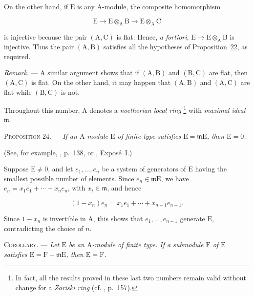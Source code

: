 On the other hand, if $\mathrm{E}$ is any $\mathrm{A}$-module, the composite homomorphism

\begin{equation*}
\mathrm{E}\longrightarrow \mathrm{E}\otimes_\mathrm{A}\mathrm{B}\longrightarrow \mathrm{E}\otimes_\mathrm{A}\mathrm{C}
\end{equation*}

is injective because the pair $(\mathrm{A},\mathrm{C})$ is flat. Hence, \emph{a fortiori},
$\mathrm{E}\to \mathrm{E}\otimes_\mathrm{A}\mathrm{B}$ is injective. Thus the pair $(\mathrm{A},\mathrm{B})$ satisfies all the
hypotheses of Proposition~\hyperref[gaga:prop:22]{22}, as required.

\emph{Remark}. --- A similar argument shows
that if $(\mathrm{A},\mathrm{B})$ and $(\mathrm{B},\mathrm{C})$ are flat, then $(\mathrm{A},\mathrm{C})$ is flat. On the other hand,
it may happen that $(\mathrm{A},\mathrm{B})$ and $(\mathrm{A},\mathrm{C})$ are flat while $(\mathrm{B},\mathrm{C})$ is not.


Throughout this number, $\mathrm{A}$ denotes a \emph{noetherian local ring}
\footnote{In fact, all the results proved in these last two numbers remain
valid without change for a \emph{Zariski ring} (cf. , p.~157).} with
\emph{maximal ideal} $\mathfrak{m}$.

\textsc{Proposition 24}. --- \emph{If an $\mathrm{A}$-module
$\mathrm{E}$ of finite type satisfies $\mathrm{E}=\mathfrak{m}\mathrm{E}$, then $\mathrm{E}=0$.}

(See, for example, , p.~138, or , Exposé~I.)

Suppose $\mathrm{E}\ne0$, and let $e_1,\ldots,e_n$ be a system of generators of $\mathrm{E}$
having the smallest possible number of elements. Since
$e_n\in\mathfrak{m}\mathrm{E}$, we have
$e_n=x_1e_1+\cdots+x_ne_n$, with $x_i\in\mathfrak{m}$, and hence

\begin{equation*}
(1-x_n)e_n=x_1e_1+\cdots+x_{n-1}e_{n-1}.
\end{equation*}

Since $1-x_n$ is invertible in $\mathrm{A}$, this shows that
$e_1,\ldots,e_{n-1}$ generate $\mathrm{E}$, contradicting the choice of $n$.

\textsc{Corollary}. --- \emph{Let $\mathrm{E}$ be an
$\mathrm{A}$-module of finite type. If a submodule $\mathrm{F}$ of $\mathrm{E}$ satisfies
$\mathrm{E}=\mathrm{F}+\mathfrak{m}\mathrm{E}$, then $\mathrm{E}=\mathrm{F}$.}

